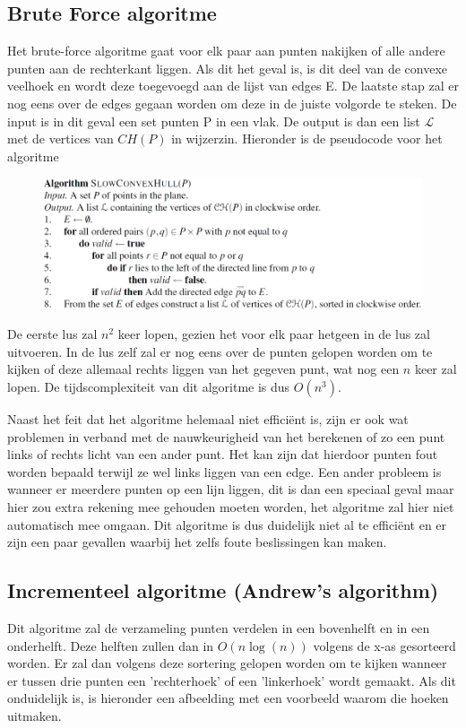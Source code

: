 \documentclass[12pt,a4paper]{article}
\begin{document}
	\subsection{Brute Force algoritme}
	Het brute-force algoritme gaat voor elk paar aan punten nakijken of alle andere punten aan de rechterkant liggen. Als dit het geval is, is dit deel van de convexe veelhoek en wordt deze toegevoegd aan de lijst van edges E. De laatste stap zal er nog eens over de edges gegaan worden om deze in de juiste volgorde te steken. 
	De input is in dit geval een set punten P in een vlak. De output is dan een list $\mathcal{L}$ met de vertices van $CH(P)$ in wijzerzin. Hieronder is de pseudocode voor het algoritme
	\begin{figure}[h]
		\centering
		\includegraphics[width=0.9\linewidth]{afbeeldingen/slowconvexhull}
		\label{fig:slowconvexhull}
	\end{figure}
	
	De eerste lus zal $n^2$ keer lopen, gezien het voor elk paar hetgeen in de lus zal uitvoeren. In de lus zelf zal er nog eens over de punten gelopen worden om te kijken of deze allemaal rechts liggen van het gegeven punt, wat nog een $n$ keer zal lopen. De tijdscomplexiteit van dit algoritme is dus $O(n^3)$. 
	
	Naast het feit dat het algoritme helemaal niet efficiënt is, zijn er ook wat problemen in verband met de nauwkeurigheid van het berekenen of zo een punt links of rechts licht van een ander punt. Het kan zijn dat hierdoor punten fout worden bepaald terwijl ze wel links liggen van een edge. Een ander probleem is wanneer er meerdere punten op een lijn liggen, dit is dan een speciaal geval maar hier zou extra rekening mee gehouden moeten worden, het algoritme zal hier niet automatisch mee omgaan. Dit algoritme is dus duidelijk niet al te efficiënt en er zijn een paar gevallen waarbij het zelfs foute beslissingen kan maken. 
	
	
	\subsection{Incrementeel algoritme 	(Andrew's algorithm)}
	Dit algoritme zal de verzameling punten verdelen in een bovenhelft en in een onderhelft. Deze helften zullen dan in $O(n\log(n))$ volgens de x-as gesorteerd worden. Er zal dan volgens deze sortering gelopen worden om te kijken wanneer er tussen drie punten een 'rechterhoek' of een 'linkerhoek' wordt gemaakt. Als dit onduidelijk is, is hieronder een afbeelding met een voorbeeld waarom die hoeken uitmaken. 
	
\end{document}

